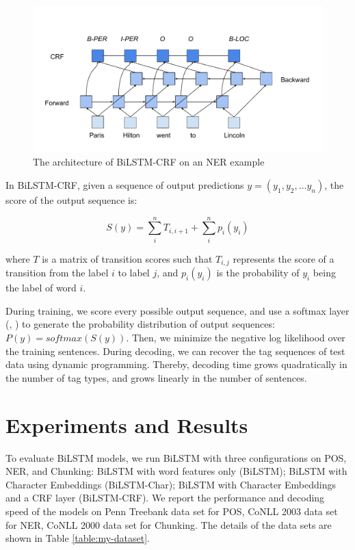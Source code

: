 \begin{figure}[h]
  \centering
  \includegraphics[scale=0.6]{bilstmcrf}
 \caption{The architecture of BiLSTM-CRF on an NER example}
  \label{fig:bilstmcrf}
\end{figure}

In BiLSTM-CRF, given a sequence of output predictions $y=\left( y_{1},y_{2},\ldots y_{n}\right)$, the score of the output sequence is:

\begin{equation}
S\left( y\right)=\sum _{i}^{n}T_{i,i+1}+\sum _{i}^{n}p_{i}\left(y_{i}\right)
\end{equation}

\noindent
where $T$ is a matrix of transition scores such that $T_{i,j}$ represents the score of a transition from the label $i$ to label $j$, and $p_{i}\left(y_{i}\right)$ is the probability of $y_{i}$ being the label of word $i$.

During training, we score every possible output sequence, and use a softmax layer (\citeauthor{dugas2001incorporating}, \citeyear{dugas2001incorporating}) to generate the probability distribution of output sequences: $P\left( y\right) = \textit{softmax}(S\left( y\right))$. Then, we minimize the negative log likelihood over the training sentences. During decoding, we can recover the tag sequences of test data using dynamic programming. Thereby, decoding time grows quadratically in the number of tag types, and grows linearly in the number of sentences.

\section{Experiments and Results}

To evaluate BiLSTM models, we run BiLSTM with three configurations on POS, NER, and Chunking: BiLSTM with word features only (BiLSTM); BiLSTM with Character Embeddings (BiLSTM-Char); BiLSTM with Character Embeddings and a CRF layer (BiLSTM-CRF). We report the performance and decoding speed of the models on Penn Treebank data set for POS, CoNLL 2003 data set for NER, CoNLL 2000 data set for Chunking. The details of the data sets are shown in Table \ref{table:my-dataset}.

